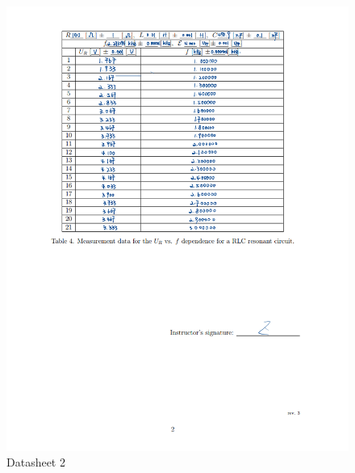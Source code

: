 \documentclass[12pt, a4paper, oneside]{article}
\begin{document}
\begin{figure}[htbp]
	\centering
	\includegraphics[width=1.0\textwidth]{D2.png}
	\caption{Datasheet 2}
\end{figure}

\end{document}
